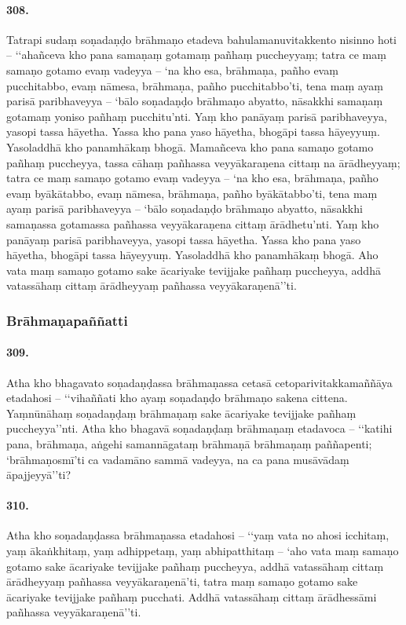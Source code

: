 \paragraph{308.} Tatrapi sudaṃ soṇadaṇḍo brāhmaṇo etadeva bahulamanuvitakkento nisinno hoti – ‘‘ahañceva kho pana samaṇaṃ gotamaṃ pañhaṃ puccheyyaṃ; tatra ce maṃ samaṇo gotamo evaṃ vadeyya – ‘na kho esa, brāhmaṇa, pañho evaṃ pucchitabbo, evaṃ nāmesa, brāhmaṇa, pañho pucchitabbo’ti, tena maṃ ayaṃ parisā paribhaveyya – ‘bālo soṇadaṇḍo brāhmaṇo abyatto, nāsakkhi samaṇaṃ gotamaṃ yoniso pañhaṃ pucchitu’nti. Yaṃ kho panāyaṃ parisā paribhaveyya, yasopi tassa hāyetha. Yassa kho pana yaso hāyetha, bhogāpi tassa hāyeyyuṃ. Yasoladdhā kho panamhākaṃ bhogā. Mamañceva kho pana samaṇo gotamo pañhaṃ puccheyya, tassa cāhaṃ pañhassa veyyākaraṇena cittaṃ na ārādheyyaṃ; tatra ce maṃ samaṇo gotamo evaṃ vadeyya – ‘na kho esa, brāhmaṇa, pañho evaṃ byākātabbo, evaṃ nāmesa, brāhmaṇa, pañho byākātabbo’ti, tena maṃ ayaṃ parisā paribhaveyya – ‘bālo soṇadaṇḍo brāhmaṇo abyatto, nāsakkhi samaṇassa gotamassa pañhassa veyyākaraṇena cittaṃ ārādhetu’nti. Yaṃ kho panāyaṃ parisā paribhaveyya, yasopi tassa hāyetha. Yassa kho pana yaso hāyetha, bhogāpi tassa hāyeyyuṃ. Yasoladdhā kho panamhākaṃ bhogā. Aho vata maṃ samaṇo gotamo sake ācariyake tevijjake pañhaṃ puccheyya, addhā vatassāhaṃ cittaṃ ārādheyyaṃ pañhassa veyyākaraṇenā’’ti.

\subsubsection{Brāhmaṇapaññatti}

\paragraph{309.} Atha kho bhagavato soṇadaṇḍassa brāhmaṇassa cetasā cetoparivitakkamaññāya etadahosi – ‘‘vihaññati kho ayaṃ soṇadaṇḍo brāhmaṇo sakena cittena. Yaṃnūnāhaṃ soṇadaṇḍaṃ brāhmaṇaṃ sake ācariyake tevijjake pañhaṃ puccheyya’’nti. Atha kho bhagavā soṇadaṇḍaṃ brāhmaṇaṃ etadavoca – ‘‘katihi pana, brāhmaṇa, aṅgehi samannāgataṃ brāhmaṇā brāhmaṇaṃ paññapenti; ‘brāhmaṇosmī’ti ca vadamāno sammā vadeyya, na ca pana musāvādaṃ āpajjeyyā’’ti?

\paragraph{310.} Atha kho soṇadaṇḍassa brāhmaṇassa etadahosi – ‘‘yaṃ vata no ahosi icchitaṃ, yaṃ ākaṅkhitaṃ, yaṃ adhippetaṃ, yaṃ abhipatthitaṃ – ‘aho vata maṃ samaṇo gotamo sake ācariyake tevijjake pañhaṃ puccheyya, addhā vatassāhaṃ cittaṃ ārādheyyaṃ pañhassa veyyākaraṇenā’ti, tatra maṃ samaṇo gotamo sake ācariyake tevijjake pañhaṃ pucchati. Addhā vatassāhaṃ cittaṃ ārādhessāmi pañhassa veyyākaraṇenā’’ti.

